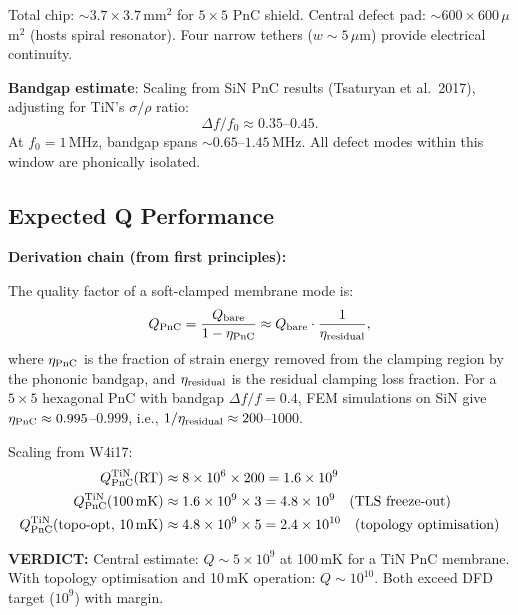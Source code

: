 \documentclass[11pt]{article}
\theoremstyle{remark}
\newcommand{\ee}[1]{\times 10^{#1}}
\newcommand{\verdict}[1]{\textcolor{green!50!black}{\textbf{VERDICT:} #1}}
\begin{document}
Total chip: $\sim 3.7 \times 3.7$\,mm$^2$ for $5 \times 5$ PnC shield.
Central defect pad: $\sim 600 \times 600\,\mu$m$^2$ (hosts spiral
resonator). Four narrow tethers ($w \sim 5\,\mu$m) provide electrical
continuity.

\textbf{Bandgap estimate}: Scaling from SiN PnC results (Tsaturyan
et al.\ 2017), adjusting for TiN's $\sigma/\rho$ ratio:
\begin{equation}
  \Delta f/f_0 \approx 0.35\text{--}0.45.
\end{equation}
At $f_0 = 1$\,MHz, bandgap spans $\sim 0.65$--$1.45$\,MHz. All
defect modes within this window are phonically isolated.

\subsection{Expected Q Performance}

\textbf{Derivation chain (from first principles):}

The quality factor of a soft-clamped membrane mode is:
\begin{equation}
  Q_{\rm PnC} = \frac{Q_{\rm bare}}{1 - \eta_{\rm PnC}} \approx
  Q_{\rm bare} \cdot \frac{1}{\eta_{\rm residual}},
  \label{eq:Qpnc}
\end{equation}
where $\eta_{\rm PnC}$ is the fraction of strain energy removed from
the clamping region by the phononic bandgap, and $\eta_{\rm residual}$
is the residual clamping loss fraction. For a $5 \times 5$ hexagonal
PnC with bandgap $\Delta f/f = 0.4$, FEM simulations on SiN give
$\eta_{\rm PnC} \approx 0.995$--$0.999$, i.e., $1/\eta_{\rm residual}
\approx 200$--$1000$.

Scaling from W4i17:
\begin{align}
  Q_{\rm PnC}^{\rm TiN}(\text{RT}) &\approx 8\ee{6} \times 200
    = 1.6\ee{9} \label{eq:QpncRT} \\
  Q_{\rm PnC}^{\rm TiN}(\text{100\,mK}) &\approx 1.6\ee{9} \times 3
    = 4.8\ee{9} \quad \text{(TLS freeze-out)} \label{eq:QpncCryo} \\
  Q_{\rm PnC}^{\rm TiN}(\text{topo-opt, 10\,mK}) &\approx 4.8\ee{9}
    \times 5 = 2.4\ee{10} \quad \text{(topology optimisation)}
    \label{eq:QpncTopo}
\end{align}

\verdict{Central estimate: $Q \sim 5\ee{9}$ at 100\,mK for a TiN PnC
membrane. With topology optimisation and 10\,mK operation:
$Q \sim 10^{10}$. Both exceed DFD target ($10^9$) with margin.}
\end{document}
